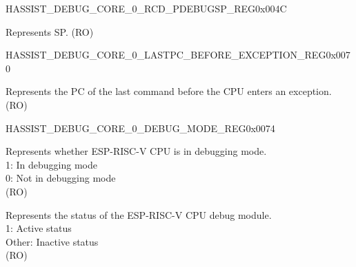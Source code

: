 \begin{register}{H}{ASSIST\_DEBUG\_CORE\_0\_RCD\_PDEBUGSP\_REG}{0x004C}\label{regdesc:ASSISTDEBUGCORE0RCDPDEBUGSPREG}
%
\regnewline%
\begin{regdesc}\begin{reglist}
\label{fielddesc:ASSISTDEBUGCORE0RCDPDEBUGSP}\item [ASSIST\_DEBUG\_CORE\_0\_RCD\_PDEBUGSP] Represents SP. (RO)
\end{reglist}\end{regdesc}
\end{register}


\begin{register}{H}{ASSIST\_DEBUG\_CORE\_0\_LASTPC\_BEFORE\_EXCEPTION\_REG}{0x0070}\label{regdesc:ASSISTDEBUGCORE0LASTPCBEFOREEXCEPTIONREG}
%
\regnewline%
\begin{regdesc}\begin{reglist}
\label{fielddesc:ASSISTDEBUGCORE0LASTPCBEFOREEXC}\item [ASSIST\_DEBUG\_CORE\_0\_LASTPC\_BEFORE\_EXC] Represents the PC of the last command before the CPU enters an exception. (RO)
\end{reglist}\end{regdesc}
\end{register}


\begin{register}{H}{ASSIST\_DEBUG\_CORE\_0\_DEBUG\_MODE\_REG}{0x0074}\label{regdesc:ASSISTDEBUGCORE0DEBUGMODEREG}
%
%
%
\regnewline%
\begin{regdesc}\begin{reglist}
\label{fielddesc:ASSISTDEBUGCORE0DEBUGMODE}\item [ASSIST\_DEBUG\_CORE\_0\_DEBUG\_MODE] Represents whether ESP-RISC-V CPU is in debugging mode.\\
1: In debugging mode\\
0: Not in debugging mode\\
(RO)
\label{fielddesc:ASSISTDEBUGCORE0DEBUGMODULEACTIVE}\item [ASSIST\_DEBUG\_CORE\_0\_DEBUG\_MODULE\_ACTIVE] Represents the status of the ESP-RISC-V CPU debug module.\\
1: Active status\\
Other: Inactive status\\
(RO)
\end{reglist}\end{regdesc}
\end{register}

